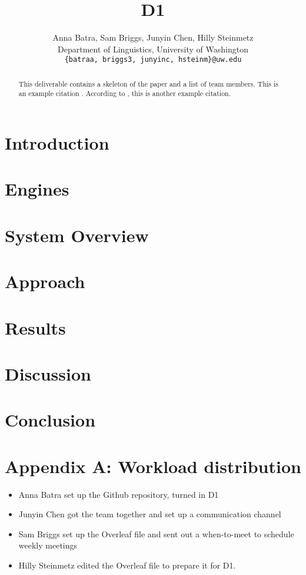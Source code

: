 \documentclass[11pt]{article}
\title{D1}
\author{Anna Batra, Sam Briggs, Junyin Chen, Hilly Steinmetz\\
          Department of Linguistics, University of Washington \\
          \texttt{\{batraa, briggs3, junyinc, hsteinm\}@uw.edu}}
\begin{document}
\maketitle
\begin{abstract}
This deliverable contains a skeleton of the paper and a list of team members. This is an example citation \citep{jurafsky-martin-draft}. According to \citet{jurafsky-martin-draft}, this is another example citation.
\end{abstract}

\section{Introduction}

\section{Engines}

\section{System Overview}

\section{Approach}

\section{Results}

\section{Discussion}

\section{Conclusion}

\section{Appendix A: Workload distribution}

\begin{itemize}
    \item Anna Batra set up the Github repository, turned in D1
    \item Junyin Chen got the team together and set up a communication channel
    \item Sam Briggs set up the Overleaf file and sent out a when-to-meet to schedule weekly meetings
    \item Hilly Steinmetz edited the Overleaf file to prepare it for D1.
\end{itemize}
\end{document}
